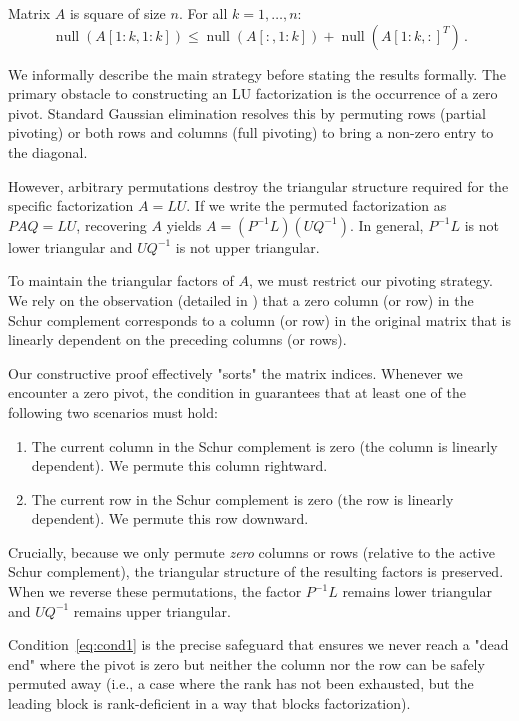 \documentclass[10pt,twoside]{siamart1116}
\DeclareMathOperator{\nl}{null}
\numberwithin{theorem}{section}
\begin{document}
\begin{property}\label{prop:rank}
  Matrix $A$ is square of size $n$. For all $k = 1, \ldots, n$:
  \begin{equation}
    \label{eq:cond1}
    \nl(A[1:k,1:k]) \le \nl(A[:,1:k]) + \nl({A[1:k,:]}^T) \,.
  \end{equation}
\end{property}

We informally describe the main strategy before stating the results formally. The primary obstacle to constructing an LU factorization is the occurrence of a zero pivot. Standard Gaussian elimination resolves this by permuting rows (partial pivoting) or both rows and columns (full pivoting) to bring a non-zero entry to the diagonal.

However, arbitrary permutations destroy the triangular structure required for the specific factorization $A=LU$. If we write the permuted factorization as $P A Q = L U$, recovering $A$ yields $A = (P^{-1} L) (U Q^{-1})$. In general, $P^{-1} L$ is not lower triangular and $U Q^{-1}$ is not upper triangular.

To maintain the triangular factors of $A$, we must restrict our pivoting strategy. We rely on the observation (detailed in ) that a zero column (or row) in the Schur complement corresponds to a column (or row) in the original matrix that is linearly dependent on the preceding columns (or rows).

Our constructive proof effectively "sorts" the matrix indices. Whenever we encounter a zero pivot, the condition in  guarantees that at least one of the following two scenarios must hold:
\begin{enumerate}
  \item The current column in the Schur complement is zero (the column is linearly dependent). We permute this column rightward.
  \item The current row in the Schur complement is zero (the row is linearly dependent). We permute this row downward.
\end{enumerate}

Crucially, because we only permute \emph{zero} columns or rows (relative to the active Schur complement), the triangular structure of the resulting factors is preserved. When we reverse these permutations, the factor $P^{-1} L$ remains lower triangular and $U Q^{-1}$ remains upper triangular.

Condition~\eqref{eq:cond1} is the precise safeguard that ensures we never reach a "dead end" where the pivot is zero but neither the column nor the row can be safely permuted away (i.e., a case where the rank has not been exhausted, but the leading block is rank-deficient in a way that blocks factorization).
\end{document}
